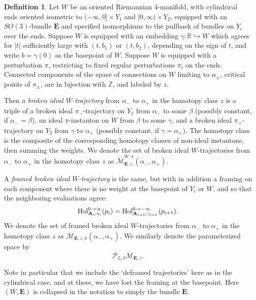 \documentclass[10pt,a4paper]{amsart}
\theoremstyle{definition}
\newtheorem{definition}[theorem]{Definition}
\theoremstyle{remark}
\numberwithin{figure}{qchap}
\begin{document}
\begin{definition}
Let $W$ be an oriented Riemannian 4-manifold, with cylindrical ends oriented isometric to $(-\infty, 0] \times Y_1$ and $[0,\infty) \times Y_2$, equipped with an $SO(3)$-bundle $\mathbf{E}$ and specified isomorphisms to the pullback of bundles on $Y_i$ over the ends. Suppose $W$ is equipped with an embedding $\gamma:\mathbb R \hookrightarrow W$ which agrees for $|t|$ sufficiently large with $(t,b_1)$ or $(t,b_2)$, depending on the sign of $t$, and write $b = \gamma(0)$ as the basepoint of $W$. Suppose $W$ is equipped with a perturbation $\pi$, restricting to fixed regular perturbations $\pi_i$ on the ends. Connected components of the space of connections on $W$ limiting to $\alpha_\pm$, critical points of $\pi_\pm$, are in bijection with $\mathbb Z$, and labeled by $z$.

Then a \emph{broken ideal $W$-trajectory} from $\alpha_-$ to $\alpha_+$ in the homotopy class $z$ is a triple of a broken ideal $\pi_-$-trajectory on $Y_1$ from $\alpha_-$ to some $\beta$ (possibly constant, if $\alpha_- = \beta$), an ideal $\pi$-instanton on $W$ from $\beta$ to some $\gamma$, and a broken ideal $\pi_+$-trajectory on $Y_2$ from $\gamma$ to $\alpha_+$ (possibly constant, if $\gamma = \alpha_+$). The homotopy class is the composite of the corresponding homotopy classes of non-ideal instantons, then summing the weights. We denote the set of broken ideal $W$-trajectories from $\alpha_-$ to $\alpha_+$ in the homotopy class $z$ as $\check{\mathcal M}^{W,\pi}_{\mathbf{E},z}(\alpha_-, \alpha_+)$.

A \emph{framed broken ideal $W$-trajectory} is the same, but with in addition a framing on each component where there is no weight at the basepoint of $Y_i$ or $W$, and so that the neighboring evaluations agree: $$\textup{Hol}^{0 \to \infty}_{\mathbf{A}_i,\gamma_i}(p_i) = \textup{Hol}^{0 \to -\infty}_{\mathbf{A}_{i+1}, \gamma_{i+1}}(p_{i+1}).$$ We denote the set of framed broken ideal $W$-trajectories from $\alpha_-$ to $\alpha_+$ in the homotopy class $z$ as $\overline{\mathcal M}_{\mathbf{E},z,\pi}(\alpha_-, \alpha_+)$. We similarly denote the parameterized space by $$\mathcal P_{L,\delta} \overline{\mathcal M}_{\mathbf{E},z}.$$
\end{definition}

Note in particular that we include the `deframed trajectories' here as in the cylindrical case, and at these, we have lost the framing at the basepoint. Here $(W,\mathbf{E})$ is collapsed in the notation to simply the bundle $\mathbf{E}$.
\end{document}
